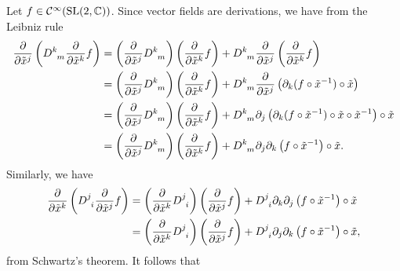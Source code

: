 Let \(f \in \mathcal{C}^\infty(\mathrm{SL}(2,\mathbb{C}))\). Since vector fields are derivations, we have from the Leibniz rule
\begin{align*}
    \bfield{\tilde{x}^j}\left(D\indices{^k_m}\bfield{\tilde{x}^k}f\right) &= \left(\bfield{\tilde{x}^j}D\indices{^k_m}\right)\left(\bfield{\tilde{x}^k}f\right) + D\indices{^k_m} \bfield{\tilde{x}^j}\left(\bfield{\tilde{x}^k}f\right)\\
                                                                          &=\left(\bfield{\tilde{x}^j}D\indices{^k_m}\right)\left(\bfield{\tilde{x}^k}f\right) + D\indices{^k_m} \bfield{\tilde{x}^j}\left(\partial_k(f \circ \tilde{x}^{-1}) \circ \tilde{x}\right)\\
                                                                          &=\left(\bfield{\tilde{x}^j}D\indices{^k_m}\right)\left(\bfield{\tilde{x}^k}f\right) + D\indices{^k_m} \partial_j\left(\partial_k(f \circ \tilde{x}^{-1}) \circ \tilde{x} \circ \tilde{x}^{-1}\right) \circ \tilde{x}\\
                                                                          &=\left(\bfield{\tilde{x}^j}D\indices{^k_m}\right)\left(\bfield{\tilde{x}^k}f\right) + D\indices{^k_m} \partial_j\partial_k\left(f \circ \tilde{x}^{-1}\right) \circ \tilde{x}.
\end{align*}
Similarly, we have
\begin{align*}
    \bfield{\tilde{x}^k}\left(D\indices{^j_i}\bfield{\tilde{x}^j}f\right) &=\left(\bfield{\tilde{x}^k}D\indices{^j_i}\right)\left(\bfield{\tilde{x}^j}f\right) + D\indices{^j_i} \partial_k\partial_j\left(f \circ \tilde{x}^{-1}\right) \circ \tilde{x}\\
    &=\left(\bfield{\tilde{x}^k}D\indices{^j_i}\right)\left(\bfield{\tilde{x}^j}f\right) + D\indices{^j_i} \partial_j\partial_k\left(f \circ \tilde{x}^{-1}\right) \circ \tilde{x},
\end{align*}
from Schwartz's theorem. It follows that
